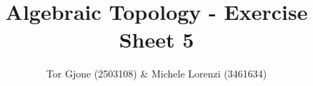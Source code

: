 \documentclass[a4paper,11pt,english]{article}
\title{\textbf{Algebraic Topology} - Exercise Sheet 5}
\author{Tor Gjone (2503108) \& Michele Lorenzi (3461634)}
\begin{document}
\mmaketitle


\begin{exercise}[1]

\end{exercise}
\end{document}
